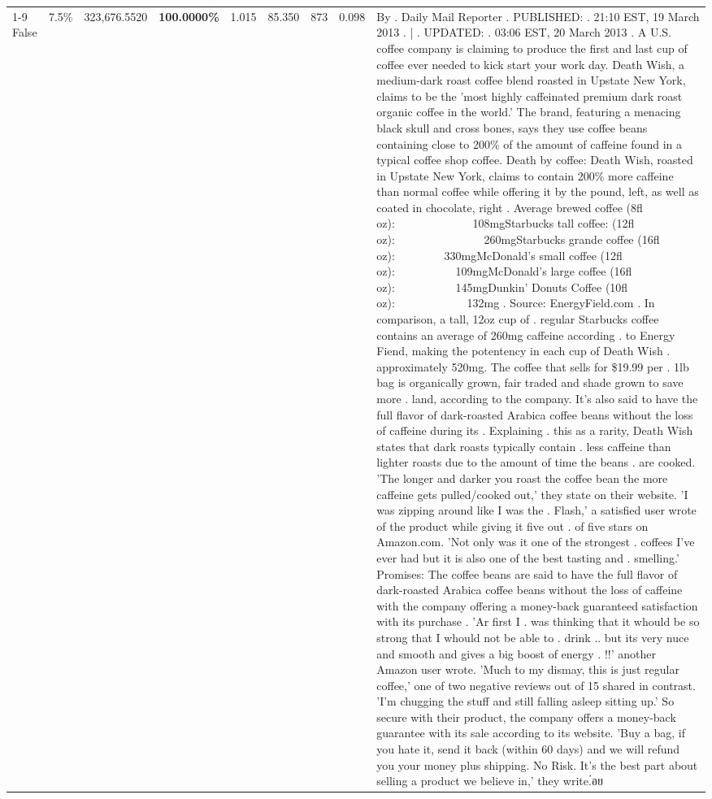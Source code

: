 \begin{table}[H]
{\begin{tabular}{lllrlllll}
\cline{1-9} \cline{2-9}
False & 7.5\% & 323,676.5520 & \bfseries \color{red} 100.0000\% & 1.015 & 85.350 & 873 & 0.098 & By . Daily Mail Reporter . PUBLISHED: . 21:10 EST, 19 March 2013 . | . UPDATED: . 03:06 EST, 20 March 2013 . A U.S. coffee company is claiming to produce the first and last cup of coffee ever needed to kick start your work day. Death Wish, a medium-dark roast coffee blend roasted in Upstate New York, claims to be the 'most highly caffeinated premium dark roast organic coffee in the world.' The brand, featuring a menacing black skull and cross bones, says they use coffee beans containing close to 200\% of the amount of caffeine found in a typical coffee shop coffee. Death by coffee: Death Wish, roasted in Upstate New York, claims to contain 200\% more caffeine than normal coffee while offering it by the pound, left, as well as coated in chocolate, right . Average brewed coffee (8fl oz):              108mgStarbucks tall coffee: (12fl oz):                260mgStarbucks grande coffee (16fl oz):         330mgMcDonald's small coffee (12fl oz):           109mgMcDonald's large coffee (16fl oz):           145mgDunkin' Donuts Coffee (10fl oz):             132mg . Source: EnergyField.com . In comparison, a tall, 12oz cup of . regular Starbucks coffee contains an average of 260mg caffeine according . to Energy Fiend, making the potentency in each cup of Death Wish . approximately 520mg. The coffee that sells for \$19.99 per . 1lb bag is organically grown, fair traded and shade grown to save more . land, according to the company. It's also said to have the full flavor of dark-roasted Arabica coffee beans without the loss of caffeine during its . Explaining . this as a rarity, Death Wish states that dark roasts typically contain . less caffeine than lighter roasts due to the amount of time the beans . are cooked. 'The longer and darker you roast the coffee bean the more caffeine gets pulled/cooked out,' they state on their website. 'I was zipping around like I was the . Flash,' a satisfied user wrote of the product while giving it five out . of five stars on Amazon.com. 'Not only was it one of the strongest . coffees I've ever had but it is also one of the best tasting and . smelling.’ Promises: The coffee beans are said to have the full flavor of dark-roasted Arabica coffee beans without the loss of caffeine with the company offering a money-back guaranteed satisfaction with its purchase . 'Ar first I . was thinking that it whould be so strong that I whould not be able to . drink .. but its very nuce and smooth and gives a big boost of energy . !!' another Amazon user wrote. 'Much to my dismay, this is just regular coffee,' one of two negative reviews out of 15 shared in contrast. 'I'm chugging the stuff and still falling asleep sitting up.' So secure with their product, the company offers a money-back guarantee with its sale according to its website. 'Buy a bag, if you hate it, send it back (within 60 days) and we will refund you your money plus shipping. No Risk. It’s the best part about selling a product we believe in,' they write.่อย \\

\end{tabular}}
\end{table}
